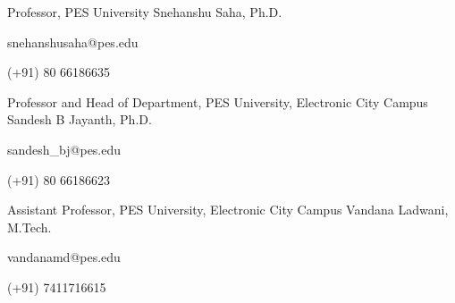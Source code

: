 
\begin{cventries}
    \cventry
        {Professor, PES University}
        {Snehanshu Saha, Ph.D.}
        {}
        {}
        {
            \begin{cvitems}
                \item snehanshusaha@pes.edu
                \item (+91) 80 66186635
            \end{cvitems}
        }
    
    \cventry
        {Professor and Head of Department, PES University, Electronic City Campus}
        {Sandesh B Jayanth, Ph.D.}
        {}
        {}
        {
            \begin{cvitems}
                \item sandesh\_bj@pes.edu
                \item (+91) 80 66186623
            \end{cvitems}
        }
    
    \cventry
        {Assistant Professor, PES University, Electronic City Campus}
        {Vandana Ladwani, M.Tech.}
        {}
        {}
        {
            \begin{cvitems}
                \item vandanamd@pes.edu
                \item (+91) 7411716615
            \end{cvitems}
        }
\end{cventries}